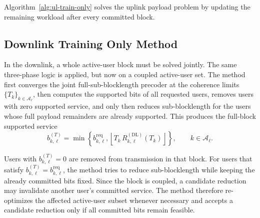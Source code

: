 \documentclass[11pt]{article}
\newcommand{\Aset}{\mathcal{A}}
\newcommand{\floor}[1]{\left\lfloor #1 \right\rfloor}
\newcommand{\DL}{\mathrm{DL}}
\begin{document}
Algorithm~\ref{alg:ul-train-only} solves the uplink payload problem by
updating the remaining workload after every committed block.

\subsection{Downlink Training Only Method}

In the downlink, a whole active-user block must be solved jointly. The same
three-phase logic is applied, but now on a coupled active-user set. The method
first converges the joint full-sub-blocklength precoder at the coherence limits
$\{T_k\}_{k\in\Aset_\ell}$, then computes the supported bits of all requested
users, removes users with zero supported service, and only then reduces
sub-blocklength for the users whose full payload remainders are already
supported. This produces the full-block supported service
\begin{equation}
b_{k,\ell}^{(T)}
=
\min\!\left\{
b_{k,\ell}^{\mathrm{req}},
\floor{T_k\,R_{k,\ell}^{(\DL)}(T_k)}
\right\},
\qquad k\in\Aset_\ell.
\label{eq:dl-full-block-service}
\end{equation}

Users with $b_{k,\ell}^{(T)}=0$ are removed from transmission in that block.
For users that satisfy
$b_{k,\ell}^{(T)}=b_{k,\ell}^{\mathrm{req}}$, the method tries to reduce
sub-blocklength while keeping the already committed bits fixed. Since the block
is coupled, a candidate reduction may invalidate another user's committed
service. The method therefore re-optimizes the affected active-user subset
whenever necessary and accepts a candidate reduction only if all committed bits
remain feasible.
\end{document}
